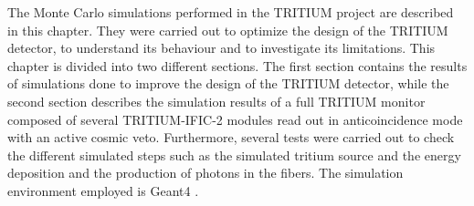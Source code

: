The Monte Carlo simulations performed in the TRITIUM project are described in this chapter. They were carried out to optimize the design of the TRITIUM detector, to understand its behaviour and to investigate its limitations. This chapter is divided into two different sections. The first section contains the results of simulations done to improve the design of the TRITIUM detector, while the second section describes the simulation results of a full TRITIUM monitor composed of several TRITIUM-IFIC-2 modules read out in anticoincidence mode with an active cosmic veto. Furthermore, several tests were carried out to check the different simulated steps such as the simulated tritium source and the energy deposition and the production of photons in the fibers. The simulation environment employed is Geant4 \cite{Geant4WebPage, Geant4P}.